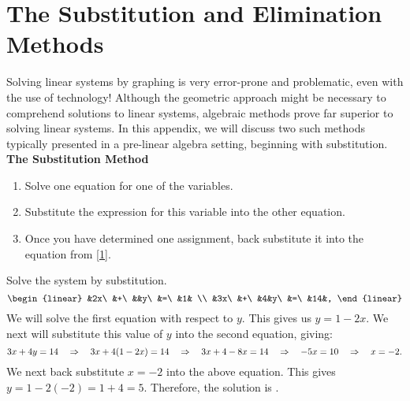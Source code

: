 \chapter{The Substitution and Elimination Methods}\label{chap:substitute}
Solving linear systems by graphing is very error-prone and problematic, even with the use of technology! Although the geometric approach might be necessary to comprehend solutions to linear systems, algebraic methods prove far superior to solving linear systems. In this appendix, we will discuss two such methods typically presented in a pre-linear algebra setting, beginning with substitution.\\

\textbf{The Substitution Method}
\begin{enumerate}[label=\arabic*., ref=\arabic*]
\item Solve one equation for one of the variables.\label{1}
\item Substitute the expression for this variable into the other equation.
\item Once you have determined one assignment, back substitute it into the equation from \ref{1}.
\end{enumerate}\vs

\begin{AppExam} Solve the system by substitution.
\[\begin{linear}
 &2x\ &+\ &&y\ &=\ &1& \\ 
&3x\ &+\ &4&y\ &=\ &14&,
\end{linear}\]
We will solve the first equation with respect to $y$. This gives us $y = 1-2x.$ We next will substitute this value of $y$ into the second equation, giving:
\[
3x+4y = 14\quad\Rightarrow\quad 3x + 4(1-2x) = 14\quad\Rightarrow\quad 3x + 4 - 8x = 14
\quad\Rightarrow\quad-5x = 10\quad\Rightarrow\quad x = -2.\] We next back substitute $x=-2$ into the above equation. This gives $y = 1-2(-2) = 1+4 = 5.$ Therefore, the solution is .
\end{AppExam}


